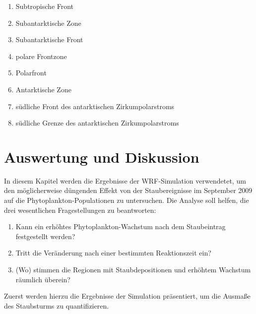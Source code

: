 \documentclass[12pt,a4paper,onecolumn]{scrartcl}
\begin{document}
\begin{enumerate}
\item Subtropische Front
\item Subantarktische Zone
\item Subantarktische Front
\item polare Frontzone
\item Polarfront
\item Antarktische Zone
\item südliche Front des antarktischen Zirkumpolarstroms
\item südliche Grenze des antarktischen Zirkumpolarstroms
\end{enumerate}

\section{Auswertung und Diskussion} \label{sec:auswertung}
In diesem Kapitel werden die Ergebnisse der WRF-Simulation verwendetet, um den möglicherweise düngenden Effekt von der Staubereignisse im September 2009 auf die Phytoplankton-Populationen zu untersuchen. Die Analyse soll helfen, die drei wesentlichen Fragestellungen zu beantworten:
\begin{enumerate}
\item Kann ein erhöhtes Phytoplankton-Wachstum nach dem Staubeintrag festgestellt werden?
\item Tritt die Veränderung nach einer bestimmten Reaktionszeit ein?
\item (Wo) stimmen die Regionen mit Staubdepositionen und erhöhtem Wachstum räumlich überein?
\end{enumerate}
Zuerst werden hierzu die Ergebnisse der Simulation präsentiert, um die Ausmaße des Staubsturms zu quantifizieren. 
\end{document}
